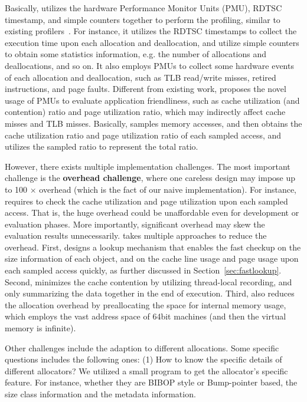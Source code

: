 Basically, \MP{} utilizes the hardware Performance Monitor Units (PMU), RDTSC timestamp, and simple counters together to perform the profiling, similar to existing profilers~\cite{Perf}. For instance, it utilizes the RDTSC timestamps to collect the execution time upon each allocation and deallocation, and utilize simple counters to obtain some statistics information, e.g. the number of allocations and deallocations, and so on. It also employs PMUs to collect some hardware events of each allocation and deallocation, such as TLB read/write misses, retired instructions, and page faults. Different from existing work, \MP{} proposes the novel usage of PMUs to evaluate application friendliness, such as cache utilization (and contention) ratio and page utilization ratio, which may indirectly affect cache misses and TLB misses. Basically, \MP{} samples memory accesses, and then obtains the cache utilization ratio and page utilization ratio of each sampled access, and utilizes the sampled ratio to represent the total ratio.    

However, there exists multiple implementation challenges. The most important challenge is the \textbf{overhead challenge}, where one careless design may impose up to 100 $\times$ overhead (which is the fact of our naive implementation). For instance, \MP{} requires to check the cache utilization and page utilization upon each sampled access. That is, the huge overhead could be unaffordable even for development or evaluation phases. More importantly, significant overhead may skew the evaluation results unnecessarily. \MP{} takes multiple approaches to reduce the overhead. First, \MP{} designs a lookup mechanism that enables the fast checkup on the size information of each object, and on the cache line usage and page usage upon each sampled access quickly, as further discussed in Section~\ref{sec:fastlookup}.  Second, \MP{} minimizes the cache contention by utilizing thread-local recording, and only summarizing the data together in the end of execution. Third, \MP{} also reduces the allocation overhead by preallocating the space for internal memory usage, which employs the vast address space of 64bit machines (and then the virtual memory is infinite). 

Other challenges include the adaption to different allocations. Some specific questions includes the following ones: (1) How to know the specific details of different allocators? We utilized a small program to get the allocator's specific feature. For instance, whether they are BIBOP style or Bump-pointer based, the size class information and the metadata information. 

